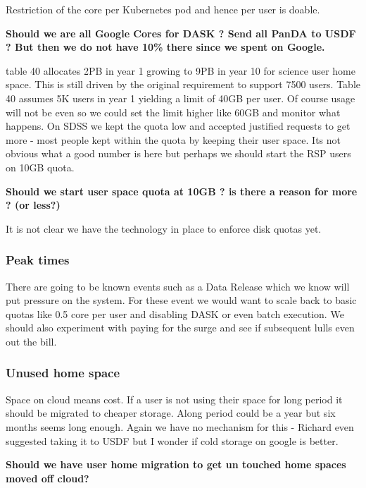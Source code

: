 Restriction of the core per Kubernetes pod and hence per user is doable.


{\bf Should we are all Google Cores for DASK ? Send all PanDA to USDF ? But then we do not have 10\% there since we spent on Google.}

 table 40 allocates 2PB in year 1 growing to 9PB in year 10 for science user home space.
This is still driven by the original requirement to support 7500 users. Table 40 assumes 5K users in year 1
yielding a limit of 40GB per user. Of course usage will not be even so we could set the limit higher like 60GB
and monitor what happens. On SDSS we kept the quota low and accepted justified requests to get more - most people kept within the quota by keeping their user space. Its not obvious what a good number is here but perhaps we should start the RSP users on 10GB quota.


{\bf Should we start user space quota at 10GB ?  is there a reason for more ? (or less?)}

It is not clear we have the technology in place to enforce disk quotas yet.

\subsubsection{Peak times}
There are going to be known events such as a Data Release which we know will put pressure on the system.
For these event we would want to scale back to basic quotas like 0.5 core per user  and disabling DASK or even batch execution.
We should also experiment with paying for the surge and see if subsequent lulls even out the bill.

\subsubsection{Unused home space}
Space on cloud means cost.
If a  user is not using their space for long period it should be migrated to cheaper storage.
Along period could be  a year but six months seems long enough.
Again we have no mechanism for this - Richard even suggested taking it to USDF but I wonder if cold storage on google is better.

{\bf Should we have user home migration to get un touched home spaces moved off cloud?}

